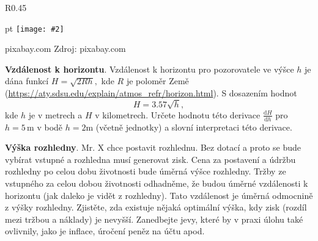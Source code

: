 \documentclass{article}
\def\zlomek{0.45}
\def\nic{}
\newcommand\obrazek[2][pixabay.com]{
  \clearpage
  \def\test{#1}
\begin{wrapfigure}{R}{\zlomek\linewidth}
  \begin{minipage}{1.0\linewidth}\parskip 0 pt
  \texttt{[image: \#2]}

  \vspace*{-10pt}
  \ifx\test\nic\else
  \null\hfill{\color{gray}\footnotesize Zdroj: #1}
  \fi

  \mezera
  \end{minipage}
\end{wrapfigure}
}
\let\oldtextbf\textbf
\def\textbf#1{%
  \oldtextbf{\color{red} #1}}
\def\mezera{\vspace*{10pt}}
\begin{document}
\obrazek{horizont.jpg}



\textbf{Vzdálenost k horizontu}.
Vzdálenost k horizontu pro pozorovatele ve výšce $h$ je dána funkcí $H=\sqrt {2Rh},$ kde $R$ je poloměr Země (\url{https://aty.sdsu.edu/explain/atmos_refr/horizon.html}). S dosazením hodnot $$H=3.57\sqrt{h},$$ kde $h$ je v metrech a $H$ v kilometrech. Určete hodnotu této derivace $\frac{\mathrm d H}{\mathrm dh}$ pro $h=5\,\mathrm{m}$ v bodě $h=2\mathrm m$ (včetně jednotky) a slovní interpretaci této derivace.


\textbf{Výška rozhledny}. Mr. X chce postavit rozhlednu. Bez
dotací a proto se bude vybírat vstupné a rozhledna musí generovat
zisk.  Cena za postavení a údržbu rozhledny po celou dobu životnosti
bude úměrná výšce rozhledny.  Tržby ze vstupného za celou dobou
životnosti odhadněme, že budou úměrné vzdálenosti k horizontu (jak
daleko je vidět z rozhledny). Tato vzdálenost je úměrná odmocnině z
výšky rozhledny. Zjistěte, zda existuje nějaká optimální výška, kdy
zisk (rozdíl mezi tržbou a náklady) je nevyšší. Zanedbejte jevy, které
by v praxi úlohu také ovlivnily, jako je inflace, úročení peněz na
účtu apod.
\end{document}
